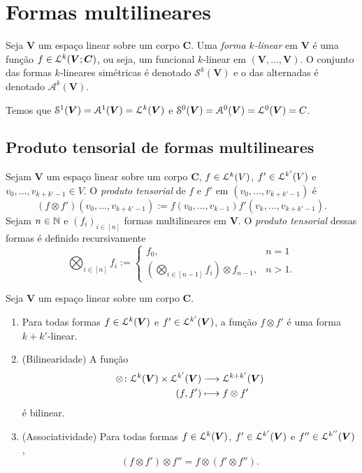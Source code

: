\section{Formas multilineares}

\begin{definition}
Seja $\bm V$ um espaço linear sobre um corpo $\bm C$. Uma \emph{forma $k$-linear} em $\bm V$ é uma função $f \in \mathcal{L}^k(\bm V;\bm C)$, ou seja, um funcional $k$-linear em $(\bm V,\ldots,\bm V)$. O conjunto das formas $k$-lineares simétricas é denotado $\mathcal{S}^k(\bm V)$ e o das alternadas é denotado $\mathcal{A}^k(\bm V)$.
\end{definition}

Temos que $\mathcal{S}^1(\bm V) = \mathcal{A}^1(\bm V) = \mathcal{L}^k(\bm V)$ e $\mathcal{S}^0(\bm V) = \mathcal{A}^0(\bm V) = \mathcal{L}^0(\bm V) = C$.

\subsection{Produto tensorial de formas multilineares}

\begin{definition}
Sejam $\bm V$ um espaço linear sobre um corpo $\bm C$, $f \in \mathcal{L}^k(V)$, $f' \in \mathcal{L}^{k'}(V)$ e $v_0,\ldots,v_{k+k'-1} \in V$. O \emph{produto tensorial} de $f$ e $f'$ em $(v_0,\ldots,v_{k+k'-1})$ é
	\begin{equation*}
	(f \otimes f')(v_0,\ldots,v_{k+k'-1}) := f(v_0,\ldots,v_{k-1})f'(v_k,\ldots,v_{k+k'-1}).
	\end{equation*}
Sejam $n \in \mathbb{N}$ e $(f_i)_{i \in [n]}$ formas multilineares em $\bm V$. O \emph{produto tensorial} dessas formas é definido recursivamente
	\begin{equation*}
	\bigotimes_{i \in [n]} f_i := \begin{cases}
		f_0,& n=1 \\
		\left(\displaystyle\bigotimes_{i \in [n-1]} f_i \right) \otimes f_{n-1} ,& n>1.
	\end{cases}
	\end{equation*}
\end{definition}

\begin{proposition}
Seja $\bm V$ um espaço linear sobre um corpo $\bm C$.
	\begin{enumerate}
	\item Para todas formas $f \in \mathcal{L}^k(\bm V)$ e $f' \in \mathcal{L}^{k'}(\bm V)$, a função $f \otimes f'$ é uma forma $k+k'$-linear.
	\item (Bilinearidade) A função
		\begin{align*}
		{\otimes}\colon {\mathcal{L}^k(\bm V) \times \mathcal{L}^{k'}(\bm V)} &\longrightarrow {\mathcal{L}^{k+k'}(\bm V)} \\{(f,f')} &\longmapsto f \otimes f'
		\end{align*}
é bilinear.
	\item (Associatividade) Para todas formas $f \in \mathcal{L}^k(\bm V)$, $f' \in \mathcal{L}^{k'}(\bm V)$ e $f'' \in \mathcal{L}^{k''}(\bm V)$,
		\begin{equation*}
		(f \otimes f') \otimes f'' = f \otimes (f' \otimes f'').
		\end{equation*}
	\end{enumerate}
\end{proposition}

